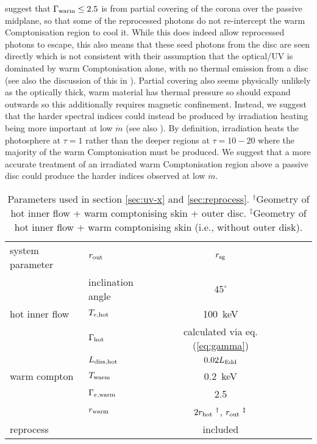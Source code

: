 \documentclass[a4paper,fleqn,usenatbib]{mnras}
\begin{document}
 \cite{petrucci2017} suggest
that $\Gamma_{\rm warm}\le 2.5$ 
is from partial covering of the corona over the passive
midplane, so that some of the reprocessed photons do not re-intercept
the warm Comptonisation region to cool it.  
While this does indeed allow reprocessed photons to escape, this also means that these
seed photons from the disc are seen directly which is not consistent with their assumption that
the optical/UV is dominated by warm Comptonisation alone, with no
thermal emission from a disc (see also the discussion of this in 
\citealt{petrucci2017}).  Partial covering also seems physically unlikely as the optically thick, warm material
has thermal pressure so should expand outwards so this additionally requires 
magnetic confinement. 
Instead, we suggest that the harder spectral indices could instead be produced by
irradiation heating being more important at low $\dot{m}$ (see
also \citealt{lawrence2012}). By definition, irradiation heats the
photosphere at $\tau=1$ rather than the deeper regions at $\tau=10-20$
where the majority of the warm Comptonisation must be produced. We
suggest that a more accurate treatment of an irradiated warm
Comptonisation region above a passive disc could produce the harder
indices observed at low $\dot{m}$. 


\begin{table}
	\centering
	\caption{Parameters used in section \ref{sec:uv-x} and \ref{sec:reprocess}. $^\dagger$Geometry of hot inner flow + warm comptonising skin + outer disc. $^\ddagger$Geometry of hot inner flow + warm comptonising skin (i.e., without outer disk). }
	\label{tab:parameter}
	\begin{tabular}{llcccc} 
		\hline\hline
system parameter&$r_{\rm out}$& $r_{\rm sg}$\\
&inclination angle &$45^\circ$\\
hot inner flow&$T_{e, \rm hot}$&100~keV\\
&$\Gamma_{\rm hot}$&calculated via eq.(\ref{eq:gamma})\\
&$L_{\rm diss, hot}$&$0.02L_{\rm Edd}$\\
warm compton&$T_{\rm warm}$&0.2~keV\\
&$\Gamma_{e, \rm warm}$&2.5\\
&$r_{\rm warm}$&$2r_{\rm hot}~^\dagger$, $r_{\rm out}~^\ddagger$\\
reprocess&&included\\
\hline
	\end{tabular}
\end{table}
\end{document}
